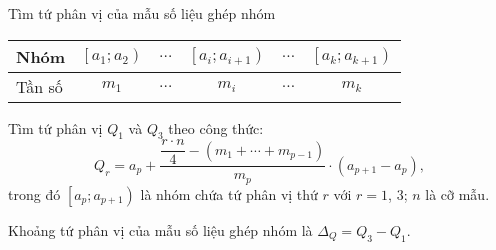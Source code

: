 \begin{dang}{Tìm tứ phân vị của mẫu số liệu ghép nhóm}
	\begin{center}
		\begin{tabular}{|l|c|c|c|c|c|}
			\hline Nhóm &{$\left[a_1; a_2\right)$} & $\ldots$ &{$\left[a_i; a_{i+1}\right)$} & $\ldots$ &{$\left[a_k; a_{k+1}\right)$} \\
			\hline Tần số & $m_1$ & $\ldots$ & $m_i$ & $\ldots$ & $m_k$ \\
			\hline
		\end{tabular}
	\end{center}
	\begin{listEX}[1]
		\item [\ding{172}] Tìm tứ phân vị $ Q_1$ và $Q_3 $ theo công thức:
		$$Q_r=a_p+\dfrac{\dfrac{r \cdot n}{4}-\left(m_1+\cdots+m_{p-1}\right)}{m_p} \cdot\left(a_{p+1}-a_p\right), $$
		trong đó $\left[a_p; a_{p+1}\right)$ là nhóm chứa tứ phân vị thứ $r$ với $r=1$, $3$; \quad $n$ là cỡ mẫu.
		\item [\ding{173}] Khoảng tứ phân vị của mẫu số liệu ghép nhóm là $\Delta_Q=Q_3-Q_1$.
	\end{listEX}
\end{dang}

